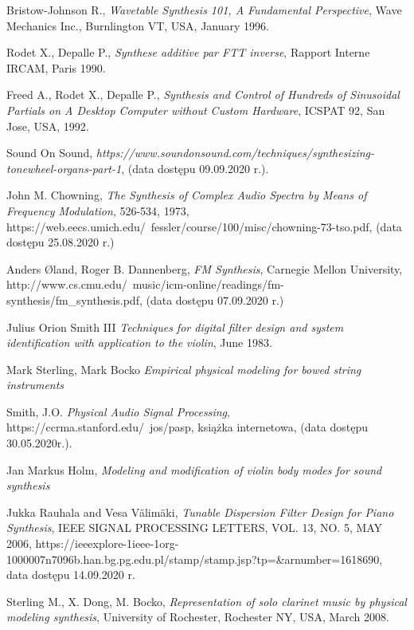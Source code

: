\documentclass[nostrict]{szablonPG}
\begin{document}
\begin{thebibliography}{20}
		Bristow-Johnson R., \emph{Wavetable Synthesis 101, A Fundamental Perspective}, Wave Mechanics Inc., Burnlington VT, USA, January 1996.
		
		Rodet X., Depalle P., \emph{Synthese additive par FTT inverse}, Rapport Interne IRCAM, Paris 1990.
		
		Freed A., Rodet X., Depalle P., \emph{Synthesis and Control of Hundreds of Sinusoidal Partials on A Desktop Computer without Custom Hardware}, ICSPAT 92, San Jose, USA, 1992.
		
		Sound On Sound, \emph{https://www.soundonsound.com/techniques/synthesizing-tonewheel-organs-part-1}, (data dostępu 09.09.2020 r.).
		
		John M. Chowning, \emph{The Synthesis of Complex Audio Spectra by Means of Frequency Modulation}, 526-534, 1973, https://web.eecs.umich.edu/~fessler/course/100/misc/chowning-73-tso.pdf, (data dostępu 25.08.2020 r.)
		
		Anders Øland, Roger B. Dannenberg, \emph{FM Synthesis},	Carnegie Mellon University, http://www.cs.cmu.edu/~music/icm-online/readings/fm-synthesis/fm\_synthesis.pdf, (data dostępu 07.09.2020 r.)
		
		Julius Orion Smith III \emph{Techniques for digital filter design and system identification with application to the violin}, June 1983.
		
		Mark Sterling, Mark Bocko \emph{Empirical physical modeling for bowed string instruments}
		
		Smith, J.O. \emph{Physical Audio Signal Processing}, https://ccrma.stanford.edu/~jos/pasp, książka internetowa, (data dostępu 30.05.2020r.).
		
		Jan Markus Holm, \emph{Modeling and modification of violin body modes for sound synthesis}
			
		Jukka Rauhala and Vesa Välimäki, \emph{Tunable Dispersion Filter Design for Piano Synthesis}, IEEE SIGNAL PROCESSING LETTERS, VOL. 13, NO. 5, MAY 2006, https://ieeexplore-1ieee-1org-1000007n7096b.han.bg.pg.edu.pl/stamp/stamp.jsp?tp=\&arnumber=1618690, data dostępu 14.09.2020 r.
		
		Sterling M., X. Dong, M. Bocko, \emph{Representation of solo clarinet music by physical modeling synthesis}, University of Rochester, Rochester NY, USA, March 2008.
		

\end{thebibliography}
\end{document}
